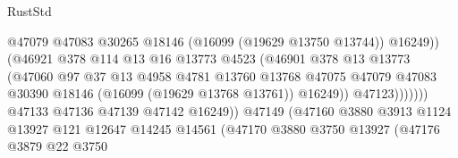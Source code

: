 \begin{lexlean}{RustStd}
\begin{coremodule}
                                              @47079
                                              @47083
                                              @30265
                                              @18146
                                              (@16099 (@19629 @13750 @13744))
                                              @16249))
                                          (@46921
                                            @378
                                            @114
                                            @13
                                            @16
                                            @13773
                                            @4523
                                            (@46901
                                              @378
                                              @13
                                              @13773
                                              (@47060
                                                @97
                                                @37
                                                @13
                                                @4958
                                                @4781
                                                @13760
                                                @13768
                                                @47075
                                                @47079
                                                @47083
                                                @30390
                                                @18146
                                                (@16099 (@19629 @13768 @13761))
                                                @16249))
                                            @47123)))))))
                              @47133
                              @47136
                              @47139
                              @47142
                              @16249))
                          @47149
                          (@47160
                            @3880
                            @3913
                            @1124
                            @13927
                            @121
                            @12647
                            @14245
                            @14561
                            (@47170
                              @3880
                              @3750
                              @13927
                              (@47176
                                @3879
                                @22
                                @3750

\end{coremodule}
\end{lexlean}
